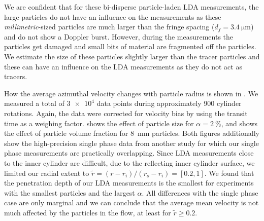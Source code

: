We are confident that for these bi-disperse particle-laden LDA measurements,
the large particles do not have an influence on the measurements as these
\emph{millimetric}-sized particles are much larger than the fringe spacing
($d_f = \SI{3.4}{\micro\metre}$) and do not show a Doppler burst.  However,
during the measurements the particles get damaged and small bits of material
are fragmented off the particles. We estimate the size of these particles
slightly larger than the tracer particles and these can have an influence on
the LDA measurements as they do not act as tracers.

How the average azimuthal velocity changes with particle radius is shown in
.  We measured a total of $\num{3e4}$ data points
during approximately 900 cylinder rotations. Again, the data were corrected
for velocity bias by using the transit time as a weighing factor. 
 shows the effect of particle size for
$\alpha=\SI{2}{\percent}$, and  shows the
effect of particle volume fraction for \SI{8}{\milli\metre} particles. Both
figures additionally show the high-precision single phase data from another
study \citep{Huisman2013} for which our single phase measurements are practically
overlapping. Since LDA measurements close to the inner cylinder are difficult,
due to the reflecting inner cylinder surface, we limited our radial extent to
$\tilde{r}=(r - r_i) / (r_o - r_i)=[0.2,1]$. We found that the penetration
depth of our LDA measurements is the smallest for experiments with the
smallest particles and the largest $\alpha$. All differences with the single
phase case are only marginal and we can conclude that the average mean
velocity is not much affected by the particles in the flow, at least for
$\tilde{r} \geq 0.2$.

